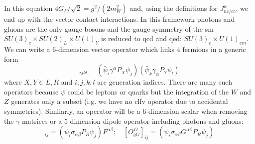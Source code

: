 \begin{refsection}
\begin{equation}
        \end{equation}
        In this equation $4G_F/\sqrt{2}=g^2/(2m_W^2)$ and, using the definitions for $J_{nc/cc}^\alpha$, we end up with the vector contact interactions.
        In this framework photons and gluons are the only gauge bosons and the gauge symmetry of the \gls{sm} $SU(3)_c\times SU(2)_L\times U(1)_Y$ is reduced to \gls{qcd} and \gls{qed}: $SU(3)_c\times U(1)_{em}$.
        We can write a 6-dimension vector operator which links 4 fermions in a generic form
        \begin{equation}
            [O^{XY}_{f}]_{ijkl}=(\bar{\psi}_i\gamma^\alpha P_X \psi_j)(\bar{\psi}_k\gamma_\alpha P_Y \psi_l)
        \end{equation}
        where $X,Y \in {L,R}$ and ${i,j,k,l}$ are generation indices. There are many such operators because $\psi$ could be leptons or quarks but the integration of the $W$ and $Z$ generates only a subset (i.g. we have no \gls{clfv} operator due to accidental symmetries).
        Similarly, an operator will be a 6-dimension scalar when removing the $\gamma$ matrices or a 5-dimension dipole operator including photons and gluons:
        \begin{equation}
            [O^D_{f\gamma}]_{ij}=(\bar{\psi}_i\sigma_{\alpha\beta}P_R\psi_j)F^{\alpha\beta};
            \quad
            [O^D_{qG}]_{ij}=(\bar{\psi}_i\sigma_{\alpha\beta}G^{\alpha\beta}P_R\psi_j)
        \end{equation}
        

\end{refsection}
